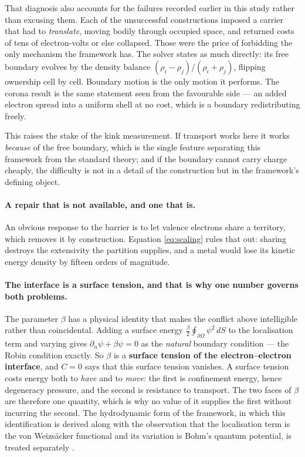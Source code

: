\documentclass[11pt]{article}
\begin{document}
That diagnosis also accounts for the failures recorded earlier in this study rather than excusing
them. Each of the unsuccessful constructions imposed a carrier that had to \emph{translate}, moving
bodily through occupied space, and returned costs of tens of electron-volts or else collapsed. Those
were the price of forbidding the only mechanism the framework has. The solver states as much
directly: its free boundary evolves by the density balance $(\rho_i - \rho_j)/(\rho_i + \rho_j)$,
flipping ownership cell by cell. Boundary motion is the only motion it performs. The corona result
is the same statement seen from the favourable side --- an added electron spread into a uniform
shell at no cost, which is a boundary redistributing freely.

This raises the stake of the kink measurement. If transport works here it works \emph{because} of
the free boundary, which is the single feature separating this framework from the standard theory;
and if the boundary cannot carry charge cheaply, the difficulty is not in a detail of the
construction but in the framework's defining object.

\paragraph{A repair that is not available, and one that is.} An obvious response to the barrier is
to let valence electrons share a territory, which removes it by construction. Equation
\eqref{eq:scaling} rules that out: sharing destroys the extensivity the partition supplies, and a
metal would lose its kinetic energy density by fifteen orders of magnitude.

\paragraph{The interface is a surface tension, and that is why one number governs both problems.}
The parameter $\beta$ has a physical identity that makes the conflict above intelligible rather than
coincidental. Adding a surface energy $\tfrac{\beta}{2}\oint_{\partial\Omega}\psi^2\,dS$ to the
localisation term and varying gives $\partial_n\psi+\beta\psi=0$ as the \emph{natural} boundary
condition --- the Robin condition exactly. So $\beta$ is a \textbf{surface tension of the
electron--electron interface}, and $C=0$ says that this surface tension vanishes. A surface tension
costs energy both to \emph{have} and to \emph{move}: the first is confinement energy, hence
degeneracy pressure, and the second is resistance to transport. The two faces of $\beta$ are
therefore one quantity, which is why no value of it supplies the first without incurring the second.
The hydrodynamic form of the framework, in which this identification is derived along with the
observation that the localisation term is the von Weizs\"acker functional and its variation is
Bohm's quantum potential, is treated separately \cite{madelung}.
\end{document}
